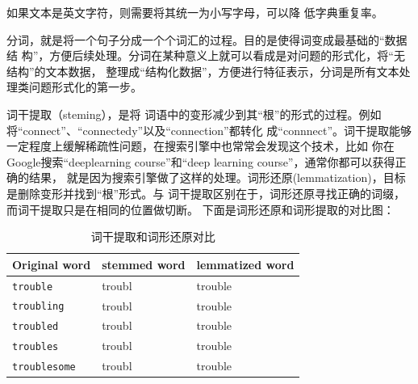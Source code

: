 如果文本是英文字符，则需要将其统一为小写字母，可以降
低字典重复率。

分词，就是将一个句子分成一个个词汇的过程。目的是使得词变成最基础的“数据结
构”，方便后续处理。分词在某种意义上就可以看成是对问题的形式化，将“无结构”的文本数据，
整理成“结构化数据”，方便进行特征表示，分词是所有文本处理类问题形式化的第一步。

词干提取（steming），是将
词语中的变形减少到其“根”的形式的过程。例如将“connect”、“connectedy”以及“connection”都转化
成“connnect”。词干提取能够一定程度上缓解稀疏性问题，在搜索引擎中也常常会发现这个技术，比如
你在Google搜索“deeplearning course”和“deep learning course”，通常你都可以获得正确的结果，
就是因为搜索引擎做了这样的处理。词形还原(lemmatization)，目标是删除变形并找到“根”形式。与
词干提取区别在于，词形还原寻找正确的词缀，而词干提取只是在相同的位置做切断。%
下面是词形还原和词形提取的对比图：

\begin{table}[H]                                                                    \begin{singlespace}                                                          
    \centering\caption{词干提取和词形还原对比}\label{tab:level}
    \renewcommand{\arraystretch}{1.5} %
    \begin{tabular}{lll}\hline
      Original word & stemmed word & lemmatized word \\  \hline                                                
      \verb|trouble| & troubl & trouble\\                                                   
      \verb|troubling| & troubl &trouble \\                                                 
      \verb|troubled| & troubl & trouble \\                                                 
      \verb|troubles| & troubl & trouble \\
      \verb|troublesome| & troubl & trouble \\      
      \hline                                                                  
\end{tabular}                                                              
\end{singlespace}                                                            \end{table}               

